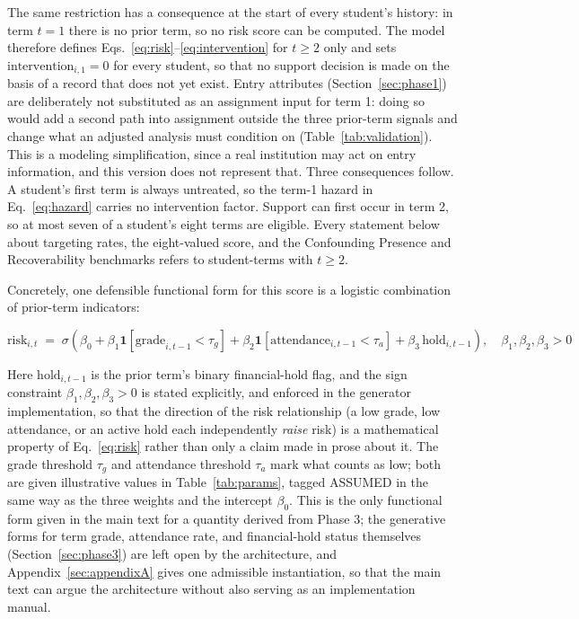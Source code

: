 \documentclass[11pt]{article}
\begin{document}
The same restriction has a consequence at the start of every student's history: in term $t=1$ there is no prior term, so no risk score can be computed. The model therefore defines Eqs.~\ref{eq:risk}--\ref{eq:intervention} for $t \ge 2$ only and sets $\text{intervention}_{i,1}=0$ for every student, so that no support decision is made on the basis of a record that does not yet exist. Entry attributes (Section~\ref{sec:phase1}) are deliberately not substituted as an assignment input for term 1: doing so would add a second path into assignment outside the three prior-term signals and change what an adjusted analysis must condition on (Table~\ref{tab:validation}). This is a modeling simplification, since a real institution may act on entry information, and this version does not represent that. Three consequences follow. A student's first term is always untreated, so the term-1 hazard in Eq.~\ref{eq:hazard} carries no intervention factor. Support can first occur in term 2, so at most seven of a student's eight terms are eligible. Every statement below about targeting rates, the eight-valued score, and the Confounding Presence and Recoverability benchmarks refers to student-terms with $t \ge 2$.

Concretely, one defensible functional form for this score is a logistic combination of prior-term indicators:

\begin{equation}
\text{risk}_{i,t} \;=\; \sigma\!\left(\beta_0 + \beta_1 \mathbf{1}[\text{grade}_{i,t-1} < \tau_g] + \beta_2 \mathbf{1}[\text{attendance}_{i,t-1} < \tau_a] + \beta_3\, \text{hold}_{i,t-1}\right), \quad \beta_1,\beta_2,\beta_3 > 0
\label{eq:risk}
\end{equation}

Here $\text{hold}_{i,t-1}$ is the prior term's binary financial-hold flag, and the sign constraint $\beta_1,\beta_2,\beta_3 > 0$ is stated explicitly, and enforced in the generator implementation, so that the direction of the risk relationship (a low grade, low attendance, or an active hold each independently \emph{raise} risk) is a mathematical property of Eq.~\ref{eq:risk} rather than only a claim made in prose about it. The grade threshold $\tau_g$ and attendance threshold $\tau_a$ mark what counts as low; both are given illustrative values in Table~\ref{tab:params}, tagged ASSUMED in the same way as the three weights and the intercept $\beta_0$. This is the only functional form given in the main text for a quantity derived from Phase 3; the generative forms for term grade, attendance rate, and financial-hold status themselves (Section~\ref{sec:phase3}) are left open by the architecture, and Appendix~\ref{sec:appendixA} gives one admissible instantiation, so that the main text can argue the architecture without also serving as an implementation manual.
\end{document}

